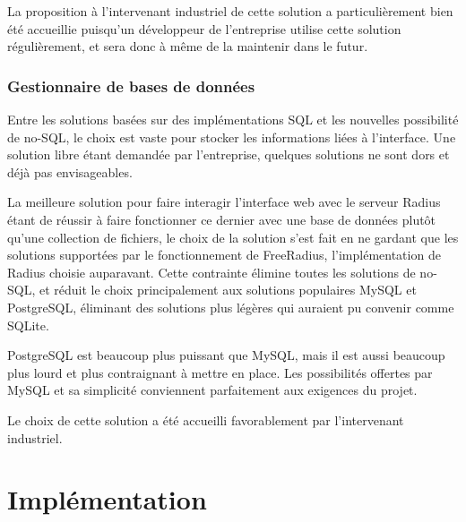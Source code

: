 La proposition à l'intervenant industriel de cette solution a particulièrement bien été accueillie puisqu'un développeur de l'entreprise utilise cette solution régulièrement, et sera donc à même de la maintenir dans le futur.

\subsubsection{Gestionnaire de bases de données}

Entre les solutions basées sur des implémentations SQL et les nouvelles possibilité de no-SQL, le choix est vaste pour stocker les informations liées à l'interface. Une solution libre étant demandée par l'entreprise, quelques solutions ne sont dors et déjà pas envisageables. 

La meilleure solution pour faire interagir l'interface web avec le serveur Radius étant de réussir à faire fonctionner ce dernier avec une base de données plutôt qu'une collection de fichiers, le choix de la solution s'est fait en ne gardant que les solutions supportées par le fonctionnement de FreeRadius, l'implémentation de Radius choisie auparavant. Cette contrainte élimine toutes les solutions de no-SQL, et réduit le choix principalement aux solutions populaires MySQL et PostgreSQL, éliminant des solutions plus légères qui auraient pu convenir comme SQLite.

PostgreSQL est beaucoup plus puissant que MySQL, mais il est aussi beaucoup plus lourd et plus contraignant à mettre en place. Les possibilités offertes par MySQL et sa simplicité conviennent parfaitement aux exigences du projet.

Le choix de cette solution a été accueilli favorablement par l'intervenant industriel.

\section{Implémentation}


